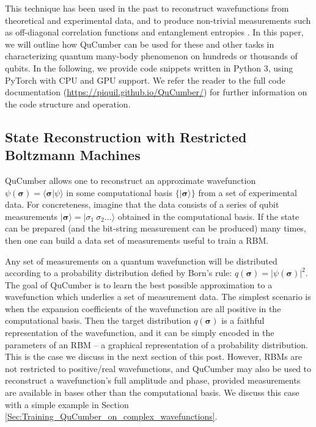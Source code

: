\documentclass[submission, Phys]{SciPost}
\begin{document}
This technique has been used in the past to reconstruct wavefunctions from theoretical and experimental data, and to produce non-trivial measurements such as off-diagonal correlation functions and entanglement entropies  \cite{Torlai2016thermo, torlai2018tomography}.
In this paper, we will outline how QuCumber can be used for these and other tasks in characterizing quantum many-body phenomenon on hundreds or thousands of qubits.
In the following, we provide code snippets written in Python 3, using PyTorch with CPU and GPU support.  We refer the reader to the full code documentation (\url{https://piquil.github.io/QuCumber/}) for further information on the code structure and operation.


\subsection{State Reconstruction with Restricted Boltzmann Machines}

QuCumber allows one to reconstruct an approximate wavefunction $\psi( \boldsymbol{\sigma} )  = \langle  \boldsymbol{\sigma} | \psi \rangle$ in some computational basis $\{ \vert \boldsymbol{ \sigma} \rangle \}$ from a set of experimental data.   For concreteness, imagine that the data consists of a series of qubit measurements $\vert {\boldsymbol{ \sigma}} \rangle = \vert { \sigma}_1~{ \sigma}_2 \dots \rangle$ obtained in the computational basis. If the state can be prepared (and the bit-string measurement can be produced) many times, then one can build a data set of measurements useful to train a RBM.

Any set of measurements on a quantum wavefunction will be distributed according to a probability distribution defied by Born's rule: $q(\boldsymbol{\sigma}) = | \psi( \boldsymbol{\sigma} ) |^2$.
The goal of QuCumber is to learn the best possible approximation to a wavefunction which underlies a set of measurement data.
The simplest scenario is when the expansion coefficients of the wavefunction are all positive in the computational basis.  
Then the target distribution $q(\boldsymbol{\sigma})$ is a faithful representation of the wavefunction, and it can be simply encoded in the parameters of an RBM -- a graphical representation of a probability distribution.   This is the case we discuss in the next section of this post.  However, RBMs are not restricted to positive/real wavefunctions, and QuCumber may also be used to reconstruct a wavefunction's full amplitude and phase, provided measurements are available in bases other than the computational basis.  We discuss this case with a simple example in Section \ref{Sec:Training_QuCumber_on_complex_wavefunctions}.
\end{document}
